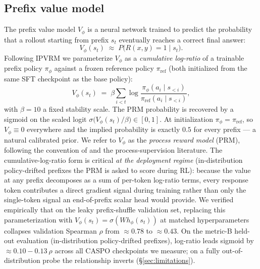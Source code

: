 \documentclass[11pt]{article}
\newcommand{\ipvrm}{IPVRM}
\begin{document}
\subsection{Prefix value model}
\label{sec:vphi}
The prefix value model $V_\phi$ is a neural network trained to predict
the probability that a rollout starting from prefix $s_t$ eventually
reaches a correct final answer:
\begin{equation}
\label{eq:vphi}
V_\phi(s_t) \;\approx\; P\big(R(x, y) = 1 \mid s_t\big).
\end{equation}
Following \ipvrm{} \citep{ipvrm2026} we parameterize $V_\phi$ as a
\emph{cumulative log-ratio} of a trainable prefix policy
$\pi_\phi$ against a frozen reference policy $\pi_{\mathrm{ref}}$
(both initialized from the same SFT checkpoint as the base policy):
\begin{equation}
\label{eq:vphi_param}
V_\phi(s_t) \;=\; \beta \sum_{i<t}
   \log\!\frac{\pi_\phi(a_i \mid s_{<i})}{\pi_{\mathrm{ref}}(a_i \mid s_{<i})},
\end{equation}
with $\beta = 10$ a fixed stability scale. The PRM probability is
recovered by a sigmoid on the scaled logit
$\sigma\!\big(V_\phi(s_t)/\beta\big) \in [0, 1]$. At initialization
$\pi_\phi = \pi_{\mathrm{ref}}$, so $V_\phi \equiv 0$ everywhere and
the implied probability is exactly $0.5$ for every prefix --- a
natural calibrated prior. We refer to $V_\phi$ as the \emph{process
reward model} (PRM), following the convention of \citet{ipvrm2026}
and the process-supervision literature. The cumulative-log-ratio
form is critical \emph{at the deployment regime} (in-distribution
policy-drifted prefixes the PRM is asked to score during RL):
because the value at any prefix decomposes as a sum of per-token
log-ratio terms, every response token contributes a direct gradient
signal during training rather than only the single-token signal an
end-of-prefix scalar head would provide. We verified empirically
that on the leaky prefix-shuffle validation set, replacing this
parameterization with $V_\phi(s_t) = \sigma(W h_\phi(s_t))$ at
matched hyperparameters collapses validation Spearman $\rho$ from
$\approx 0.78$ to $\approx 0.43$. On the metric-B held-out
evaluation (in-distribution policy-drifted prefixes), log-ratio
leads sigmoid by ${\approx}0.10{-}0.13~\rho$ across all CASPO
checkpoints we measure; on a fully out-of-distribution probe the
relationship inverts (\S\ref{sec:limitations}).
\end{document}
